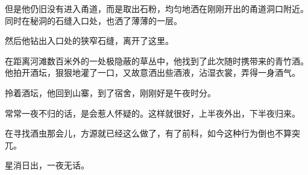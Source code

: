 \begin{this_body}
但是他仍旧没有进入甬道，而是取出石粉，均匀地洒在刚刚开出的甬道洞口附近。同时在秘洞的石缝入口处，也洒了薄薄的一层。

然后他钻出入口处的狭窄石缝，离开了这里。

在距离河滩数百米外的一处极隐蔽的草丛中，他找到了此次随时携带来的青竹酒。他拍开酒坛，狠狠地灌了一口，又故意洒出些酒液，沾湿衣裳，弄得一身酒气。

拎着酒坛，他回到山寨，到了宿舍，刚刚好是午夜时分。

常常一夜不归的话，是会惹人怀疑的。这样就很好，上半夜外出，下半夜归来。

在寻找酒虫那会儿，方源就已经这么做了，有了前科，如今这种行为倒也不算突兀。

星消日出，一夜无话。

\end{this_body}

